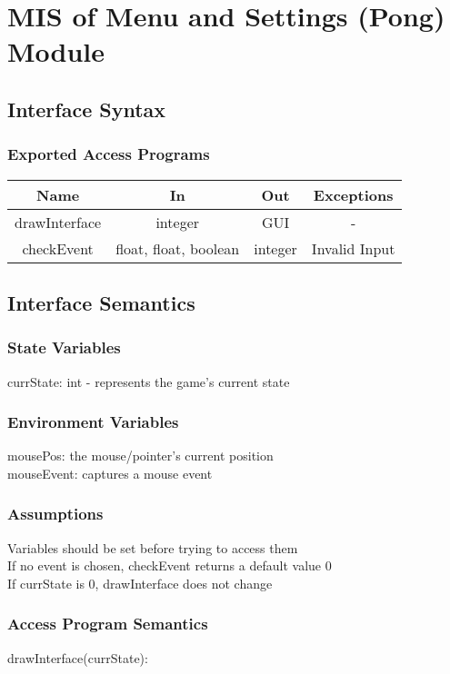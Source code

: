 \documentclass[12pt, titlepage]{article}
\begin{document}
\section{MIS of Menu and Settings (Pong) Module}
		\subsection{Interface Syntax}
		\subsubsection{Exported Access Programs}
		\begin{tabular}[pos]{|c|c|c|c|}
			\hline
			\textbf{Name}& \textbf{In} & \textbf{Out} & \textbf{Exceptions} \\ \hline
			drawInterface & integer & GUI & - \\ \hline
			checkEvent & float, float, boolean & integer & Invalid Input \\ \hline
			
		\end{tabular}
		
		\subsection{Interface Semantics}
		\subsubsection{State Variables}
		currState: int - represents the game's current state
		
		\subsubsection{Environment Variables}
		mousePos: the mouse/pointer's current position\\
		mouseEvent: captures a mouse event 
		\subsubsection{Assumptions}
		Variables should be set before trying to access them \\ 
		If no event is chosen, checkEvent returns a default value 0 \\
		If currState is 0, drawInterface does not change \\
		
		\subsubsection{Access Program Semantics}
		drawInterface(currState):
		
\end{document}
